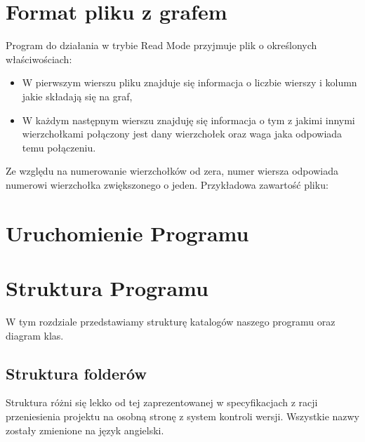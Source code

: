 \documentclass[10pt, a4paper]{report}
\begin{document}
\section{Format pliku z grafem}\label{sec:format-pliku-z-grafem}
Program do działania w trybie Read Mode przyjmuje plik o określonych właściwościach:
    \begin{itemize}
        \item W pierwszym wierszu pliku znajduje się informacja o liczbie wierszy i kolumn jakie składają się na graf,
        \item W każdym następnym wierszu znajduję się informacja o tym z jakimi innymi wierzchołkami połączony jest dany wierzchołek oraz waga jaka odpowiada temu połączeniu.
    \end{itemize}
    Ze względu na numerowanie wierzchołków od zera, numer wiersza odpowiada numerowi wierzchołka zwiększonego o jeden. 
    Przykładowa zawartość pliku:
    

\section{Uruchomienie Programu}\label{sec:uruchomienie-programu}


\section{Struktura Programu}\label{sec:struktura-programu}
W tym rozdziale przedstawiamy strukturę katalogów naszego programu oraz diagram klas.

\subsection{Struktura folderów}\label{subsec:struktura-folderów}
Struktura różni się lekko od tej zaprezentowanej w specyfikacjach z racji przeniesienia projektu na osobną stronę
z system kontroli wersji. Wszystkie nazwy zostały zmienione na język angielski.
\end{document}
